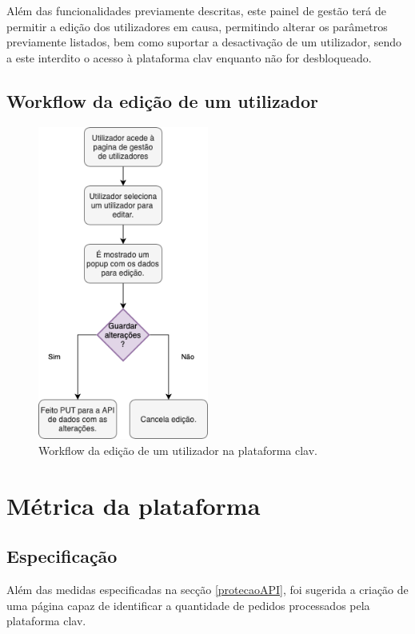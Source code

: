 Além das funcionalidades previamente descritas, este painel de gestão terá de permitir a edição dos utilizadores em causa, permitindo alterar os parâmetros previamente listados, bem como suportar a desactivação de um utilizador, sendo a este interdito o acesso à plataforma \gls{clav} enquanto não for desbloqueado.

\cleardoublepage
\subsection{Workflow da edição de um utilizador}

\begin{figure}[h!]
    \centering
    \includegraphics[width=0.5\textwidth]{img/diagramas/gestaometrica/Edicao.png}
    \caption{Workflow da edição de um utilizador na plataforma \gls{clav}.}
    \label{fig:flow_Edicao}
\end{figure}

\cleardoublepage
\section{Métrica da plataforma}
\vspace{-4mm}
\subsection{Especificação}
\vspace{-3mm}
Além das medidas especificadas na secção \ref{protecaoAPI}, foi sugerida a criação de uma página capaz de identificar a quantidade de pedidos processados pela plataforma \gls{clav}.

